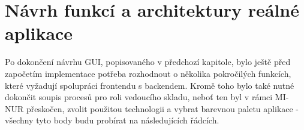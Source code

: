 \chapter{Návrh funkcí a architektury reálné aplikace}

Po dokončení návrhu GUI, popisovaného v předchozí kapitole, bylo ještě před započetím implementace potřeba rozhodnout o několika pokročilých funkcích, které vyžadují spolupráci frontendu s backendem. Kromě toho bylo také nutné dokončit soupis procesů pro roli vedoucího skladu, neboť ten byl v rámci MI-NUR přeskočen, zvolit použitou technologii a vybrat barevnou paletu aplikace - všechny tyto body budu probírat na následujících řádcích.









